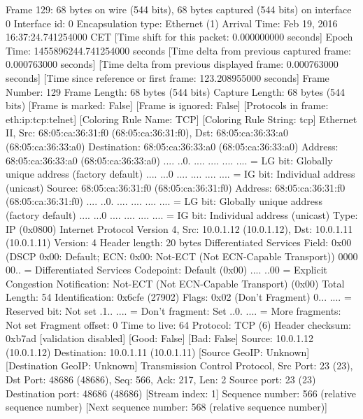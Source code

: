 Frame 129: 68 bytes on wire (544 bits), 68 bytes captured (544 bits) on interface 0
    Interface id: 0
    Encapsulation type: Ethernet (1)
    Arrival Time: Feb 19, 2016 16:37:24.741254000 CET
    [Time shift for this packet: 0.000000000 seconds]
    Epoch Time: 1455896244.741254000 seconds
    [Time delta from previous captured frame: 0.000763000 seconds]
    [Time delta from previous displayed frame: 0.000763000 seconds]
    [Time since reference or first frame: 123.208955000 seconds]
    Frame Number: 129
    Frame Length: 68 bytes (544 bits)
    Capture Length: 68 bytes (544 bits)
    [Frame is marked: False]
    [Frame is ignored: False]
    [Protocols in frame: eth:ip:tcp:telnet]
    [Coloring Rule Name: TCP]
    [Coloring Rule String: tcp]
Ethernet II, Src: 68:05:ca:36:31:f0 (68:05:ca:36:31:f0), Dst: 68:05:ca:36:33:a0 (68:05:ca:36:33:a0)
    Destination: 68:05:ca:36:33:a0 (68:05:ca:36:33:a0)
        Address: 68:05:ca:36:33:a0 (68:05:ca:36:33:a0)
        .... ..0. .... .... .... .... = LG bit: Globally unique address (factory default)
        .... ...0 .... .... .... .... = IG bit: Individual address (unicast)
    Source: 68:05:ca:36:31:f0 (68:05:ca:36:31:f0)
        Address: 68:05:ca:36:31:f0 (68:05:ca:36:31:f0)
        .... ..0. .... .... .... .... = LG bit: Globally unique address (factory default)
        .... ...0 .... .... .... .... = IG bit: Individual address (unicast)
    Type: IP (0x0800)
Internet Protocol Version 4, Src: 10.0.1.12 (10.0.1.12), Dst: 10.0.1.11 (10.0.1.11)
    Version: 4
    Header length: 20 bytes
    Differentiated Services Field: 0x00 (DSCP 0x00: Default; ECN: 0x00: Not-ECT (Not ECN-Capable Transport))
        0000 00.. = Differentiated Services Codepoint: Default (0x00)
        .... ..00 = Explicit Congestion Notification: Not-ECT (Not ECN-Capable Transport) (0x00)
    Total Length: 54
    Identification: 0x6cfe (27902)
    Flags: 0x02 (Don't Fragment)
        0... .... = Reserved bit: Not set
        .1.. .... = Don't fragment: Set
        ..0. .... = More fragments: Not set
    Fragment offset: 0
    Time to live: 64
    Protocol: TCP (6)
    Header checksum: 0xb7ad [validation disabled]
        [Good: False]
        [Bad: False]
    Source: 10.0.1.12 (10.0.1.12)
    Destination: 10.0.1.11 (10.0.1.11)
    [Source GeoIP: Unknown]
    [Destination GeoIP: Unknown]
Transmission Control Protocol, Src Port: 23 (23), Dst Port: 48686 (48686), Seq: 566, Ack: 217, Len: 2
    Source port: 23 (23)
    Destination port: 48686 (48686)
    [Stream index: 1]
    Sequence number: 566    (relative sequence number)
    [Next sequence number: 568    (relative sequence number)]
